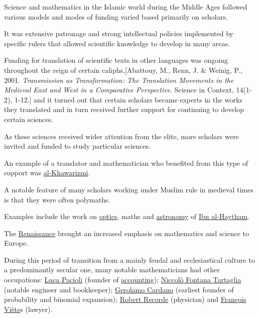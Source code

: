 \documentclass{book}
\numberwithin{equation}{section}
\begin{document}
%
Science and mathematics in the Islamic world during the Middle Ages followed various models and modes of funding varied based primarily on scholars.

It was extensive patronage and strong intellectual policies implemented by specific rulers that allowed scientific knowledge to develop in many areas.

Funding for translation of scientific texts in other languages was ongoing throughout the reign of certain caliphs,[Abattouy, M., Renn, J. \& Weinig, P., 2001. \textit{Transmission as Transformation: The Translation Movements in the Medieval East and West in a Comparative Perspective}. Science in Context, 14(1-2), 1-12.] and it turned out that certain scholars became experts in the works they translated and in turn received further support for continuing to develop certain sciences.

As these sciences received wider attention from the elite, more scholars were invited and funded to study particular sciences.

An example of a translator and mathematician who benefited from this type of support was \href{https://en.wikipedia.org/wiki/Al-Khawarizmi}{al-Khawarizmi}.

A notable feature of many scholars working under Muslim rule in medieval times is that they were often polymaths.

Examples include the work on \href{https://en.wikipedia.org/wiki/Optics}{optics}, maths and \href{https://en.wikipedia.org/wiki/Astronomy}{astronomy} of \href{https://en.wikipedia.org/wiki/Ibn_al-Haytham}{Ibn al-Haytham}.

%
The \href{https://en.wikipedia.org/wiki/Renaissance}{Renaissance} brought an increased emphasis on mathematics and science to Europe.

During this period of transition from a mainly feudal and ecclesiastical culture to a predominantly secular one, many notable mathematicians had other occupations: \href{https://en.wikipedia.org/wiki/Luca_Pacioli}{Luca Pacioli} (founder of \href{https://en.wikipedia.org/wiki/Accounting}{accounting}); \href{https://en.wikipedia.org/wiki/Niccol%C3%B2_Fontana_Tartaglia}{Niccolò Fontana Tartaglia} (notable engineer and bookkeeper); \href{https://en.wikipedia.org/wiki/Gerolamo_Cardano}{Gerolamo Cardano} (earliest founder of probability and binomial expansion); \href{https://en.wikipedia.org/wiki/Robert_Recorde}{Robert Recorde} (physician) and \href{https://en.wikipedia.org/wiki/Fran%C3%A7ois_Vi%C3%A8te}{François Viète}s (lawyer). 
\end{document}
